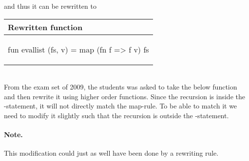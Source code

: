 \begin{example}
  \noindent
  and thus it can be rewritten to
  
  \begin{center}
    \begin{tabular}{|l|}
      \hline
      \textbf{Rewritten function} \\ \hline
      \begin{sml}
fun evallist (fs, v) = map (fn f => f v) fs
      \end{sml} \\ \hline
    \end{tabular}
  \end{center}
  
\end{example}

\begin{example}\ \\
  \label{ex:map-instance-collatz}
  \noindent
  From the exam set of 2009, the students was asked to take the below
  function and then rewrite it using higher order functions. Since the recursion
  is inside the -statement, it will not directly match the
  \textsf{map}-rule. To be able to match it we need to modify it slightly such
  that the recursion is outside the -statement. 

  \paragraph{Note.} This modification could just as well have been done by
  a rewriting rule. 



\end{example}

